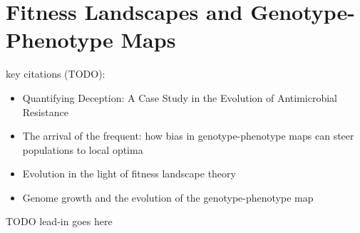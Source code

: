 \section{Fitness Landscapes and Genotype-Phenotype Maps}
\label{sec:fitness-landscape}

key citations (TODO):
\begin{itemize}
  \item Quantifying Deception: A Case Study in the Evolution of Antimicrobial Resistance \citep{eppstein2016quantifying}
  \item The arrival of the frequent: how bias in genotype-phenotype maps can steer populations to local optima \citep{schaper2014arrival}
  \item Evolution in the light of fitness landscape theory \citep{fragata2019evolution}
  \item Genome growth and the evolution of the genotype-phenotype map \citep{altenberg1995genome}
\end{itemize}

TODO lead-in goes here

